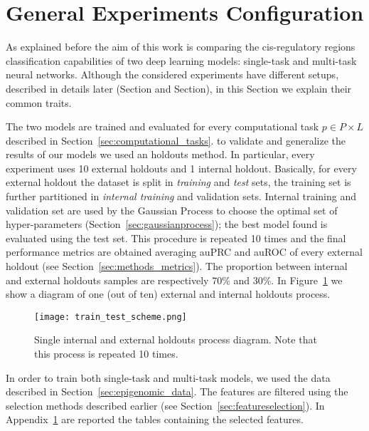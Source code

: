 \section{General Experiments Configuration}
As explained before the aim of this work is comparing the  cis-regulatory regions classification capabilities of two deep learning models: single-task and multi-task neural networks. Although the considered experiments have different setups, described in details later (Section and Section), in this Section we explain their common traits. 

The two models are trained and evaluated for every computational task $p \in P \times L$ described in Section~\ref{sec:computational_tasks}. 
to validate and generalize the results of our
models we used an holdouts method. In particular, every experiment uses 10 external holdouts and 1 internal
holdout. Basically, for every external
holdout the dataset is split in \emph{training} and \emph{test} sets, the
training set is further partitioned in \emph{internal training} and validation
sets. Internal training and validation set are used by the Gaussian Process to
choose the optimal set of hyper-parameters (Section~\ref{sec:gaussianprocess});
the best model found is evaluated using the test set. This procedure is
repeated 10 times and the final performance metrics are obtained averaging auPRC
and auROC of every external holdout (see Section~\ref{sec:methods_metrics}). The proportion between internal and external holdouts samples are respectively 70\% and 30\%. In Figure~\ref{fig:train_test_diagram} we show a diagram of one (out of ten) external and internal holdouts process. 
\begin{figure}[ht]
\centering
\texttt{[image: train\_test\_scheme.png]}
\caption{Single internal and external holdouts process diagram. Note that this
process is repeated 10 times.} 
\label{fig:train_test_diagram}
\end{figure}
In order to train both single-task and multi-task models, we used the data described in Section~\ref{sec:epigenomic_data}. The features are filtered using the selection methods described earlier (see Section~\ref{sec:featureselection}). In Appendix~\ref{} are reported the tables containing the selected features.

